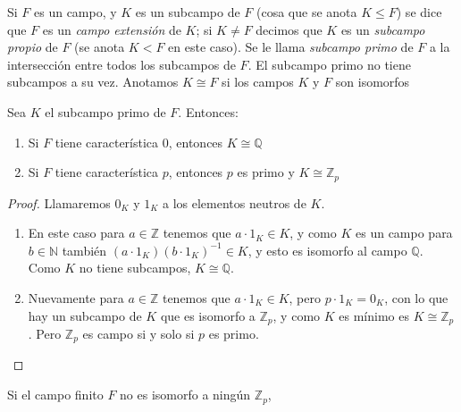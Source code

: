   Si \(F\) es un campo,
  y \(K\) es un subcampo de \(F\)%
  (cosa que se anota \(K \le F\))
  se dice que \(F\) es un \emph{campo extensión} de \(K\);%
  si \(K \ne F\)
  decimos que \(K\) es un \emph{subcampo propio} de \(F\)%
  (se anota \(K < F\) en este caso).
  Se le llama \emph{subcampo primo} de \(F\)%
  a la intersección entre todos los subcampos de \(F\).
  El subcampo primo no tiene subcampos a su vez.
  Anotamos \(K \cong F\)
  si los campos \(K\) y \(F\) son isomorfos%
  \begin{theorem}
    \label{theo:prime-subfield}
    Sea \(K\) el subcampo primo de \(F\).
    Entonces:
    \begin{enumerate}[label = (\roman*), ref = (\roman*)]
    \item
      \label{en:prime-subfield-Q}
      Si \(F\) tiene característica \(0\),
      entonces \(K \cong \mathbb{Q}\)
    \item
      \label{en:prime-subfield-Zp}
      Si \(F\) tiene característica \(p\),
      entonces \(p\) es primo y \(K \cong \mathbb{Z}_p\)
    \end{enumerate}
  \end{theorem}
  \begin{proof}
    Llamaremos \(0_K\) y \(1_K\) a los elementos neutros de \(K\).
    \begin{enumerate}[label = (\roman*), ref = (\roman*)]
    \item
      En este caso para \(a \in \mathbb{Z}\)
      tenemos que \(a \cdot 1_K \in K\),
      y como \(K\) es un campo para \(b \in \mathbb{N}\)
      también \((a \cdot 1_K) (b \cdot 1_K)^{-1} \in K\),
      y esto es isomorfo al campo \(\mathbb{Q}\).
      Como \(K\) no tiene subcampos,
      \(K \cong \mathbb{Q}\).
    \item
      Nuevamente para \(a \in \mathbb{Z}\)
      tenemos que \(a \cdot 1_K \in K\),
      pero \(p \cdot 1_K = 0_K\),
      con lo que hay un subcampo de \(K\)
      que es isomorfo a \(\mathbb{Z}_p\),
      y como \(K\) es mínimo es \(K \cong \mathbb{Z}_p\).
      Pero \(\mathbb{Z}_p\) es campo si y solo si \(p\) es primo.
    \qedhere
    \end{enumerate}
  \end{proof}
  Si el campo finito \(F\) no es isomorfo a ningún \(\mathbb{Z}_p\),
